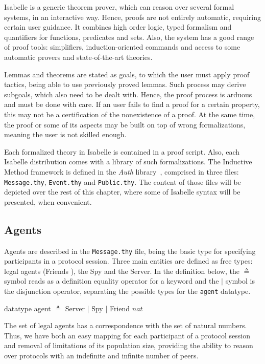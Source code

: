 Isabelle is a generic theorem prover, which can reason over several formal systems, in an interactive way. Hence, proofs are not entirely automatic, requiring certain user guidance. It combines high order logic, typed formalism and quantifiers for functions, predicates and sets. Also, the system has a good range of proof tools: simplifiers, induction-oriented commands and access to some automatic provers and state-of-the-art theories.

Lemmas and theorems are stated as goals, to which the user must apply proof tactics, being able to use previously proved lemmas. Such process may derive subgoals, which also need to be dealt with. Hence, the proof process is arduous and must be done with care. If an user fails to find a proof for a certain property, this may not be a certification of the nonexistence of a proof. At the same time, the proof or some of its aspects may be built on top of wrong formalizations, meaning the user is not skilled enough.

Each formalized theory in Isabelle is contained in a proof script. Also, each Isabelle distribution comes with a library of such formalizations. The Inductive Method framework is defined in the \textit{Auth} library~\cite{isabelle-hol-auth}, comprised in three files: \texttt{Message.thy}, \texttt{Event.thy} and \texttt{Public.thy}. The content of those files will be depicted over the rest of this chapter, where some of Isabelle syntax will be presented, when convenient.



\subsection{Agents}
Agents are described in the \texttt{Message.thy} file, being the basic type for specifying participants in a protocol session. Three main entities are defined as free types: legal agents (Friends ), the Spy and the Server. In the definition below, the \( \triangleq \) symbol reads as a definition equality operator for a keyword and the \(|\) symbol is the disjunction operator, separating the possible types for the \texttt{agent} datatype.

\begin{center}
  {\ttfamily datatype agent \( \triangleq \) Server | Spy | Friend \(nat\)}
\end{center}

The set of legal agents has a correspondence with the set of natural numbers. Thus, we have both an easy mapping for each participant of a protocol session and removal of limitations of its population size, providing the ability to reason over protocols with an indefinite and infinite number of peers.

